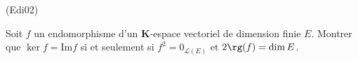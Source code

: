 \begin{tiny}(Edi02)\end{tiny}
Soit $f$ un endomorphisme d'un $\mathbf{K}$-espace vectoriel de dimension finie $E$. Montrer que $\ker f=\mathrm{Im}f$ si et seulement si $f^{2}=0_{\mathcal{L}(E)}$ et $2\rg (f)=\dim E$.
